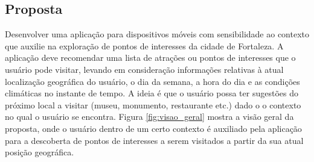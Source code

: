 \documentclass[10pt,a4paper,twocolumn]{article}
\begin{document}
\subsection*{Proposta}
Desenvolver uma aplicação para dispositivos móveis com sensibilidade ao contexto que auxilie na exploração de pontos de interesses da cidade de Fortaleza. A aplicação deve recomendar uma lista de atrações ou pontos de interesses que o usuário pode visitar, levando em consideração informações relativas à atual localização geográfica do usuário, o dia da semana, a hora do dia e as condições climáticas no instante de tempo. A ideia é que o usuário possa ter sugestões do próximo local a visitar (museu, monumento, restaurante etc.) dado o o contexto no qual o usuário se encontra. Figura \ref{fig:visao_geral} mostra a visão geral da proposta, onde o usuário dentro de um certo contexto é auxiliado pela aplicação para a descoberta de pontos de interesses a serem visitados a partir da sua atual posição geográfica.
\end{document}
